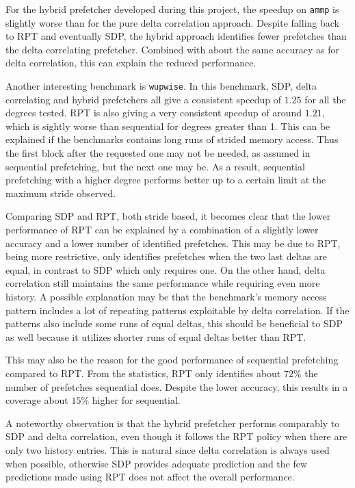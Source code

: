 For the hybrid prefetcher developed during this project, the speedup on \texttt{ammp} is slightly
worse than for the pure delta correlation approach.
Despite falling back to RPT and eventually SDP, the hybrid approach identifies
fewer prefetches than the delta correlating prefetcher.
Combined with about the same accuracy as for delta correlation, this can explain
the reduced performance.

Another interesting benchmark is \texttt{wupwise}.
In this benchmark, SDP, delta correlating and hybrid prefetchers all give a
consistent speedup of $1.25$ for all the degrees tested.
RPT is also giving a very consistent speedup of around $1.21$, which is sightly
worse than sequential for degrees greater than 1.
This can be explained if the benchmarks contains long runs of strided memory
access.
Thus the first block after the requested one may not be needed, as assumed in
sequential prefetching, but the next one may be.
As a result, sequential prefetching with a higher degree performs better up to a
certain limit at the maximum stride observed.

Comparing SDP and RPT, both stride based, it becomes clear that the lower
performance of RPT can be explained by a combination of a slightly lower
accuracy and a lower number of identified prefetches.
This may be due to RPT, being more restrictive, only identifies prefetches when
the two last deltas are equal, in contrast to SDP which only requires one.
On the other hand, delta correlation still maintains the same performance while
requiring even more history.
A possible explanation may be that the benchmark's memory access pattern
includes a lot of repeating patterns exploitable by delta correlation.
If the patterns also include some runs of equal deltas, this should be
beneficial to SDP as well because it utilizes shorter runs of equal deltas
better than RPT.

This may also be the reason for the good performance of sequential prefetching
compared to RPT.
From the statistics, RPT only identifies about $72\%$ the number of prefetches
sequential does.
Despite the lower accuracy, this results in a coverage about $15\%$ higher for
sequential.

A noteworthy observation is that the hybrid prefetcher performs comparably to
SDP and delta correlation, even though it follows the RPT policy when there are
only two history entries.
This is natural since delta correlation is always used when possible, otherwise
SDP provides adequate prediction and the few predictions made using RPT does not
affect the overall performance.

